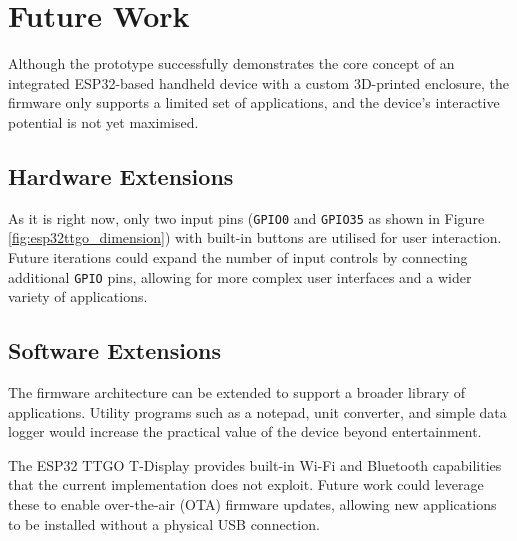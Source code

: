\section{Future Work}

Although the prototype successfully demonstrates the core concept of an integrated ESP32-based handheld device with a custom 3D-printed enclosure, the firmware only supports a limited set of applications, and the device's interactive potential is not yet maximised.

\subsection*{Hardware Extensions}

As it is right now, only two input pins (\texttt{GPIO0} and \texttt{GPIO35} as shown in Figure \ref{fig:esp32ttgo_dimension}) with built-in buttons are utilised for user interaction. Future iterations could expand the number of input controls by connecting additional \texttt{GPIO} pins, allowing for more complex user interfaces and a wider variety of applications.

\subsection*{Software Extensions}

The firmware architecture can be extended to support a broader library of applications. Utility programs such as a notepad, unit converter, and simple data logger would increase the practical value of the device beyond entertainment.

The ESP32 TTGO T-Display provides built-in Wi-Fi and Bluetooth capabilities that the current implementation does not exploit. Future work could leverage these to enable over-the-air (OTA) firmware updates, allowing new applications to be installed without a physical USB connection.
